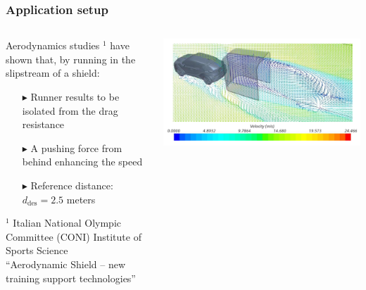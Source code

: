 \documentclass[9pt, aspectratio=169]{beamer}
\begin{document}
\begin{frame}[t]
\frametitle{Application setup}

\begin{columns}
\begin{column}{0.67\textwidth}
Aerodynamics studies $^1$ have shown that, by running in the slipstream of a shield:
\begin{itemize}
	\footnotesize
	\item[$\blacktriangleright$] Runner results to be isolated from the drag resistance
	\item[$\blacktriangleright$] A pushing force from behind enhancing the speed
	\item[$\blacktriangleright$] Reference distance: $d_\text{des} = 2.5$ meters
\end{itemize}
\vspace{0.3cm}
{\color{gray} 
$^1$ Italian National Olympic Committee (CONI) Institute of Sports Science \\
\hspace{0.1cm} “Aerodynamic Shield – new training support technologies”}
\end{column}
\begin{column}{0.32\textwidth}
	\begin{center}
  		\hspace{-0.9cm}\includegraphics[width=1.2\textwidth]{Aerodynamics} 
	\end{center}
\end{column}
\end{columns}


\end{frame}
\end{document}
